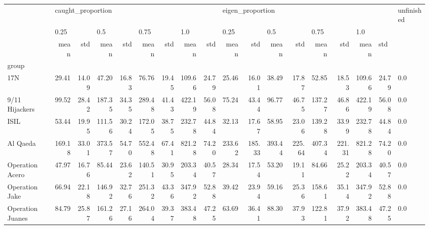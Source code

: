 \begin{tabular}{lrrrrrrrrrrrrrrrrl}
\toprule
{} & \multicolumn{8}{l}{caught\_proportion} & \multicolumn{8}{l}{eigen\_proportion} & unfinished \\
{} & \multicolumn{2}{l}{0.25} & \multicolumn{2}{l}{0.5} & \multicolumn{2}{l}{0.75} & \multicolumn{2}{l}{1.0} & \multicolumn{2}{l}{0.25} & \multicolumn{2}{l}{0.5} & \multicolumn{2}{l}{0.75} & \multicolumn{3}{l}{1.0} \\
{} &              mean &    std &    mean &    std &    mean &    std &    mean &    std &             mean &     std &    mean &     std &    mean &     std &    mean & \multicolumn{2}{l}{std} \\
group                &                   &        &         &        &         &        &         &        &                  &         &         &         &         &         &         &        &            \\
\midrule
17N                  &             29.41 &  14.09 &   47.20 &  16.83 &   76.76 &  19.45 &  109.66 &  24.79 &            25.46 &   16.01 &   38.49 &   17.87 &   52.85 &   18.53 &  109.66 &  24.79 &        0.0 \\
9/11 Hijackers       &             99.52 &  28.42 &  187.35 &  34.35 &  289.48 &  41.43 &  422.19 &  56.08 &            75.24 &   43.44 &   96.77 &   46.75 &  137.27 &   46.86 &  422.19 &  56.08 &        0.0 \\
ISIL                 &             53.44 &  19.95 &  111.56 &  30.24 &  172.05 &  38.75 &  232.78 &  44.84 &            32.13 &   17.67 &   58.95 &   23.06 &  139.28 &   33.99 &  232.78 &  44.84 &        0.0 \\
Al Qaeda             &            169.18 &  33.01 &  373.57 &  54.70 &  552.48 &  67.41 &  821.28 &  74.20 &           233.62 &  185.33 &  393.44 &  225.64 &  407.34 &  221.31 &  821.28 &  74.20 &        0.0 \\
Operation Acero      &             47.97 &  16.76 &   85.44 &  23.62 &  140.51 &  30.95 &  203.34 &  40.57 &            28.34 &   17.54 &   53.20 &   19.11 &   84.66 &   25.22 &  203.34 &  40.57 &        0.0 \\
Operation Jake       &             66.94 &  22.18 &  146.92 &  32.76 &  251.32 &  43.36 &  347.92 &  52.88 &            39.42 &   23.94 &   59.16 &   25.36 &  158.61 &   35.14 &  347.92 &  52.88 &        0.0 \\
Operation Juanes     &             84.79 &  25.87 &  161.26 &  27.16 &  264.04 &  39.37 &  383.48 &  47.25 &            63.69 &   36.41 &   88.30 &   37.93 &  122.81 &   37.92 &  383.48 &  47.25 &        0.0 \\

\end{tabular}
